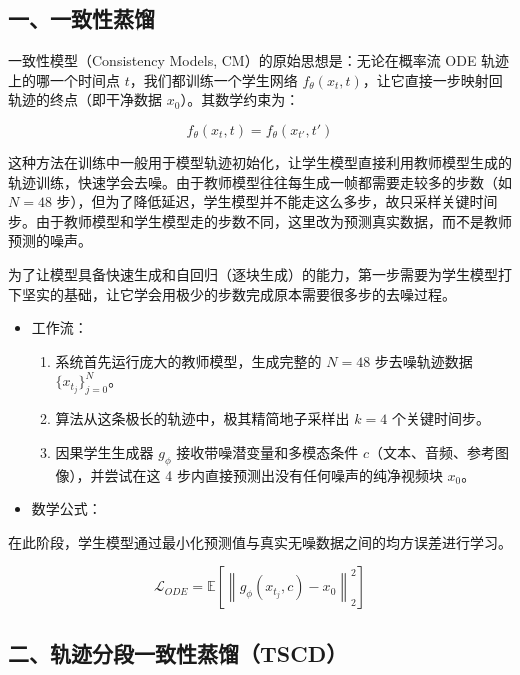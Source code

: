 \hypertarget{ux4e00ux4e00ux81f4ux6027ux84b8ux998f}{%
\subsection{一、一致性蒸馏}\label{ux4e00ux4e00ux81f4ux6027ux84b8ux998f}}

一致性模型（Consistency Models, CM）的原始思想是：无论在概率流 ODE 轨迹上的哪一个时间点 \(t\)，我们都训练一个学生网络 \(f_\theta(x_t,t)\)，让它直接一步映射回轨迹的终点（即干净数据 \(x_0\)）。其数学约束为：

\[
f_\theta(x_t,t)=f_\theta(x_{t'},t')
\]

这种方法在训练中一般用于模型轨迹初始化，让学生模型直接利用教师模型生成的轨迹训练，快速学会去噪。由于教师模型往往每生成一帧都需要走较多的步数（如 \(N=48\) 步），但为了降低延迟，学生模型并不能走这么多步，故只采样关键时间步。由于教师模型和学生模型走的步数不同，这里改为预测真实数据，而不是教师预测的噪声。

为了让模型具备快速生成和自回归（逐块生成）的能力，第一步需要为学生模型打下坚实的基础，让它学会用极少的步数完成原本需要很多步的去噪过程。

\begin{itemize}
\tightlist
\item
  工作流：

  \begin{enumerate}
  \def\labelenumi{\arabic{enumi}.}
  \tightlist
  \item
    系统首先运行庞大的教师模型，生成完整的 \(N=48\) 步去噪轨迹数据 \(\{x_{t_j}\}_{j=0}^{N}\)。
  \item
    算法从这条极长的轨迹中，极其精简地子采样出 \(k=4\) 个关键时间步。
  \item
    因果学生生成器 \(g_\phi\) 接收带噪潜变量和多模态条件 \(c\)（文本、音频、参考图像），并尝试在这 4 步内直接预测出没有任何噪声的纯净视频块 \(x_0\)。
  \end{enumerate}
\item
  数学公式：
\end{itemize}

在此阶段，学生模型通过最小化预测值与真实无噪数据之间的均方误差进行学习。

\[
\mathcal{L}_{ODE}=\mathbb{E}\left[\left\|g_\phi(x_{t_j},c)-x_0\right\|_2^2\right]
\]

\hypertarget{ux4e8cux8f68ux8ff9ux5206ux6bb5ux4e00ux81f4ux6027ux84b8ux998ftscd}{%
\subsection{二、轨迹分段一致性蒸馏（TSCD）}\label{ux4e8cux8f68ux8ff9ux5206ux6bb5ux4e00ux81f4ux6027ux84b8ux998ftscd}}

